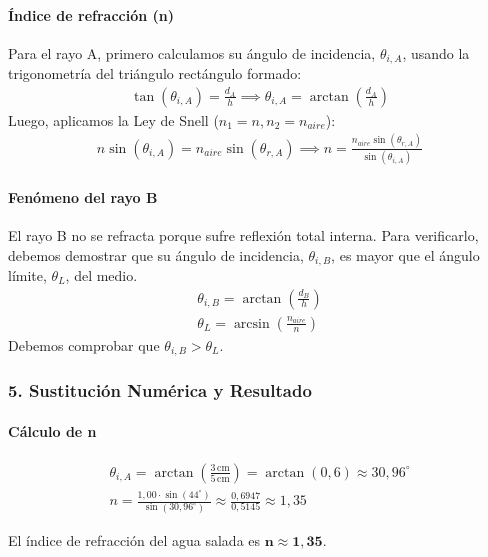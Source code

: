 \paragraph*{Índice de refracción (n)}
Para el rayo A, primero calculamos su ángulo de incidencia, $\theta_{i,A}$, usando la trigonometría del triángulo rectángulo formado:
\begin{gather}
    \tan(\theta_{i,A}) = \frac{d_A}{h} \implies \theta_{i,A} = \arctan\left(\frac{d_A}{h}\right)
\end{gather}
Luego, aplicamos la Ley de Snell ($n_1=n, n_2=n_{aire}$):
\begin{gather}
    n \sin(\theta_{i,A}) = n_{aire} \sin(\theta_{r,A}) \implies n = \frac{n_{aire} \sin(\theta_{r,A})}{\sin(\theta_{i,A})}
\end{gather}
\paragraph*{Fenómeno del rayo B}
El rayo B no se refracta porque sufre reflexión total interna. Para verificarlo, debemos demostrar que su ángulo de incidencia, $\theta_{i,B}$, es mayor que el ángulo límite, $\theta_L$, del medio.
\begin{gather}
    \theta_{i,B} = \arctan\left(\frac{d_B}{h}\right) \\
    \theta_L = \arcsin\left(\frac{n_{aire}}{n}\right)
\end{gather}
Debemos comprobar que $\theta_{i,B} > \theta_L$.

\subsubsection*{5. Sustitución Numérica y Resultado}
\paragraph*{Cálculo de n}
\begin{gather}
    \theta_{i,A} = \arctan\left(\frac{3\,\text{cm}}{5\,\text{cm}}\right) = \arctan(0,6) \approx 30,96^{\circ} \\
    n = \frac{1,00 \cdot \sin(44^{\circ})}{\sin(30,96^{\circ})} \approx \frac{0,6947}{0,5145} \approx 1,35
\end{gather}
\begin{cajaresultado}
    El índice de refracción del agua salada es $\boldsymbol{n \approx 1,35}$.
\end{cajaresultado}
